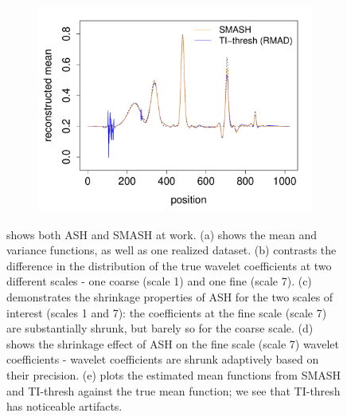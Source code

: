 \documentclass[12pt]{article}
\begin{document}
\begin{figure}
\begin{subfigure}[b]{0.48\textwidth}
        \includegraphics[width=\textwidth]{simple_eg_5.pdf}
        \caption{}
        \label{fig:simple_eg_5}
    \end{subfigure}
    \caption{shows both ASH and SMASH at work. (a) shows the mean and variance functions, as well as one realized dataset. (b) contrasts the difference in the distribution of the true wavelet coefficients at two different scales - one coarse (scale 1) and one fine (scale 7). (c) demonstrates the shrinkage properties of ASH for the two scales of interest (scales 1 and 7): the coefficients at the fine scale (scale 7) are substantially shrunk, but barely so for the coarse scale. (d) shows the shrinkage effect of ASH on the fine scale (scale 7) wavelet coefficients - wavelet coefficients are shrunk adaptively based on their precision. (e) plots the estimated mean functions from SMASH and TI-thresh against the true mean function; we see that TI-thresh has noticeable artifacts.}
    \label{fig:simple_eg}
\end{figure}
\end{document}
